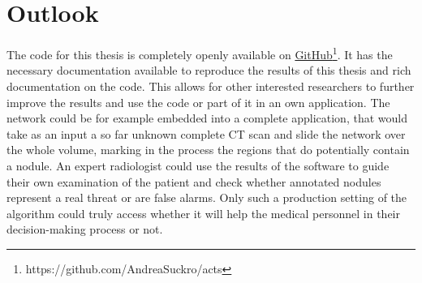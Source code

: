 \documentclass[main.tex]{subfiles}
\begin{document}
\section{Outlook}
The code for this thesis is completely openly available on \href{https://github.com/AndreaSuckro/acts}{GitHub}\footnote{https://github.com/AndreaSuckro/acts}. It has the necessary documentation available to reproduce the results of this thesis and rich documentation on the code. This allows for other interested researchers to further improve the results and use the code or part of it in an own application. The network could be for example embedded into a complete application, that would take as an input a so far unknown complete CT scan and slide the network over the whole volume, marking in the process the regions that do potentially contain a nodule. An expert radiologist could use the results of the software to guide their own examination of the patient and check whether annotated nodules represent a real threat or are false alarms. Only such a production setting of the algorithm could truly access whether it will help the medical personnel in their decision-making process or not.


\end{document}
